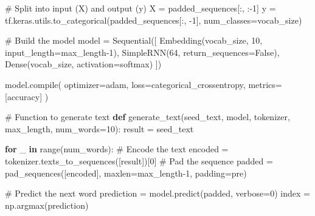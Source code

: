 \documentclass[
  letterpaper,
  DIV=11,
  numbers=noendperiod]{scrreprt}
\newenvironment{Shaded}{\begin{snugshade}}{\end{snugshade}}
\newcommand{\BuiltInTok}[1]{\textcolor[rgb]{0.00,0.23,0.31}{#1}}
\newcommand{\CommentTok}[1]{\textcolor[rgb]{0.37,0.37,0.37}{#1}}
\newcommand{\ControlFlowTok}[1]{\textcolor[rgb]{0.00,0.23,0.31}{\textbf{#1}}}
\newcommand{\DecValTok}[1]{\textcolor[rgb]{0.68,0.00,0.00}{#1}}
\newcommand{\KeywordTok}[1]{\textcolor[rgb]{0.00,0.23,0.31}{\textbf{#1}}}
\newcommand{\NormalTok}[1]{\textcolor[rgb]{0.00,0.23,0.31}{#1}}
\newcommand{\OperatorTok}[1]{\textcolor[rgb]{0.37,0.37,0.37}{#1}}
\newcommand{\StringTok}[1]{\textcolor[rgb]{0.13,0.47,0.30}{#1}}
\newcommand{\VariableTok}[1]{\textcolor[rgb]{0.07,0.07,0.07}{#1}}
\begin{document}
\begin{Shaded}
\begin{Highlighting}[]
\CommentTok{\# Split into input (X) and output (y)}
\NormalTok{X }\OperatorTok{=}\NormalTok{ padded\_sequences[:, :}\OperatorTok{{-}}\DecValTok{1}\NormalTok{]}
\NormalTok{y }\OperatorTok{=}\NormalTok{ tf.keras.utils.to\_categorical(padded\_sequences[:, }\OperatorTok{{-}}\DecValTok{1}\NormalTok{], num\_classes}\OperatorTok{=}\NormalTok{vocab\_size)}

\CommentTok{\# Build the model}
\NormalTok{model }\OperatorTok{=}\NormalTok{ Sequential([}
\NormalTok{    Embedding(vocab\_size, }\DecValTok{10}\NormalTok{, input\_length}\OperatorTok{=}\NormalTok{max\_length}\OperatorTok{{-}}\DecValTok{1}\NormalTok{),}
\NormalTok{    SimpleRNN(}\DecValTok{64}\NormalTok{, return\_sequences}\OperatorTok{=}\VariableTok{False}\NormalTok{),}
\NormalTok{    Dense(vocab\_size, activation}\OperatorTok{=}\StringTok{\textquotesingle{}softmax\textquotesingle{}}\NormalTok{)}
\NormalTok{])}

\NormalTok{model.}\BuiltInTok{compile}\NormalTok{(}
\NormalTok{    optimizer}\OperatorTok{=}\StringTok{\textquotesingle{}adam\textquotesingle{}}\NormalTok{,}
\NormalTok{    loss}\OperatorTok{=}\StringTok{\textquotesingle{}categorical\_crossentropy\textquotesingle{}}\NormalTok{,}
\NormalTok{    metrics}\OperatorTok{=}\NormalTok{[}\StringTok{\textquotesingle{}accuracy\textquotesingle{}}\NormalTok{]}
\NormalTok{)}

\CommentTok{\# Function to generate text}
\KeywordTok{def}\NormalTok{ generate\_text(seed\_text, model, tokenizer, max\_length, num\_words}\OperatorTok{=}\DecValTok{10}\NormalTok{):}
\NormalTok{    result }\OperatorTok{=}\NormalTok{ seed\_text}
    
    \ControlFlowTok{for}\NormalTok{ \_ }\KeywordTok{in} \BuiltInTok{range}\NormalTok{(num\_words):}
        \CommentTok{\# Encode the text}
\NormalTok{        encoded }\OperatorTok{=}\NormalTok{ tokenizer.texts\_to\_sequences([result])[}\DecValTok{0}\NormalTok{]}
        \CommentTok{\# Pad the sequence}
\NormalTok{        padded }\OperatorTok{=}\NormalTok{ pad\_sequences([encoded], maxlen}\OperatorTok{=}\NormalTok{max\_length}\OperatorTok{{-}}\DecValTok{1}\NormalTok{, padding}\OperatorTok{=}\StringTok{\textquotesingle{}pre\textquotesingle{}}\NormalTok{)}
        
        \CommentTok{\# Predict the next word}
\NormalTok{        prediction }\OperatorTok{=}\NormalTok{ model.predict(padded, verbose}\OperatorTok{=}\DecValTok{0}\NormalTok{)}
\NormalTok{        index }\OperatorTok{=}\NormalTok{ np.argmax(prediction)}
        

\end{Highlighting}
\end{Shaded}
\end{document}
